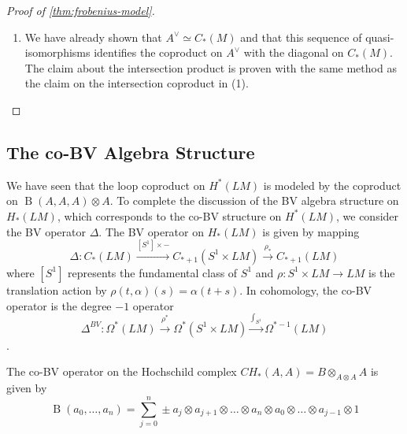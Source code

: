 \documentclass{scrartcl}
\theoremstyle{plain}
\newtheorem{proposition}[theorem]{Proposition}
\theoremstyle{definition}
\newtheorem{remark}[theorem]{Remark}
\newcommand{\APL}{A_{PL}}
\newcommand{\quiso}{\simeq}
\let\xto\xrightarrow
\let\xfrom\xleftarrow
\DeclareMathOperator{\BC}{B}
\newcommand{\blank}{-}
\begin{document}
\begin{proof}[Proof of \cref{thm:frobenius-model}]
\begin{enumerate}
    \item We have already shown that $A^{\vee} \quiso C_*(M)$ and that this sequence of quasi-isomorphisms identifies the coproduct on $A^{\vee}$ with the diagonal on $C_*(M)$. The claim about the intersection product is proven with the same method as the claim on the intersection coproduct in (1). 
    \end{enumerate}
\end{proof}



\subsection{The co-BV Algebra Structure} \label{subsec:co-bv-alg}
We have seen that the loop coproduct on $H^*(LM)$ is modeled by the coproduct on $\BC(A, A, A)\otimes A$. To complete the discussion of the BV algebra structure on $H_*(LM)$, which corresponds to the co-BV structure on $H^*(LM)$, we consider the BV operator $\Delta$. The BV operator on $H_*(LM)$ is given by mapping $$\Delta\colon C_*(LM)\xto{[S^1]\times\blank} C_{*+1}(S^1\times LM)\xto{\rho_*} C_{*+1}(LM)$$
where $[S^1]$ represents the fundamental class of $S^1$ and $\rho\colon S^1\times LM\to LM$ is the translation action by $\rho(t, \alpha)(s) = \alpha(t+s)$. In cohomology, the co-BV operator is the degree $-1$ operator $$\Delta^{BV}\colon \Omega^*(LM) \xto{\rho^*} \Omega^*(S^1\times LM) \xto{\int_{S^1}} \Omega^{*-1}(LM)$$.

The co-BV operator on the Hochschild complex $CH_*(A, A) = B\otimes_{A\otimes A} A$ is given by $$\BC(a_0, \dots, a_n) = \sum_{j=0}^n \pm a_j\otimes  a_{j+1}\otimes  \dots\otimes  a_n\otimes  a_0\otimes  \dots \otimes a_{j-1} \otimes 1$$
\end{document}

